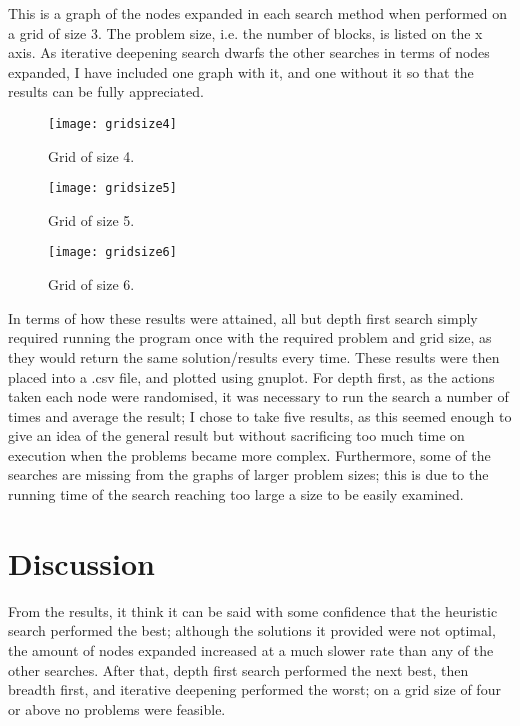 \documentclass[a4paper,10pt]{article}
\begin{document}
This is a graph of the nodes expanded in each search method when performed on  a grid of size 3. The problem size, i.e. the number of blocks, is listed on the x axis. As iterative deepening search dwarfs
the other searches in terms of nodes expanded, I have included one graph with it, and one without it so that the results can be fully appreciated. \\
\vspace{0.4cm}

\begin{figure}
	\caption{Grid of size 4.}
	\centering
		\texttt{[image: gridsize4]}
\end{figure}

\begin{figure}
	\caption{Grid of size 5.}
	\centering
		\texttt{[image: gridsize5]}
\end{figure}

\begin{figure}
	\caption{Grid of size 6.}
	\centering
		\texttt{[image: gridsize6]}
\end{figure}

In terms of how these results were attained, all but depth first search simply required running the program once with the required problem and grid size, as they would return the same solution/results every time.
These results were then placed into a .csv file, and plotted using gnuplot.
For depth first, as the actions taken each node were randomised, it was necessary to run the search a number of times and average the result; I chose to take five results, as this seemed enough to give an idea of the general 
result but without sacrificing too much time on execution when the problems became more complex. 
Furthermore, some of the searches are missing from the graphs of larger problem sizes; this is due to the running time of the search reaching too large a size to be easily examined.

\section{Discussion}

From the results, it think it can be said with some confidence that the heuristic search performed the best; although the solutions it provided were not optimal, the amount of nodes expanded increased at a much slower rate than any of the other searches. 
After that, depth first search performed the next best, then breadth first, and iterative deepening performed the worst; on a grid size of four or above no problems were feasible.
\end{document}
